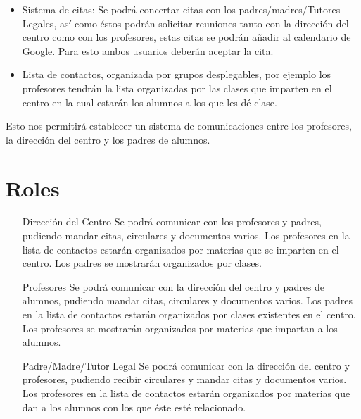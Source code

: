 \begin{itemize}
	\item Sistema de citas: Se podr\'a concertar citas con los padres/madres/Tutores Legales, as\'i como \'estos podr\'an solicitar reuniones tanto con la direcci\'on del centro como con los profesores, estas citas se podr\'an a\~nadir al calendario de Google. Para esto ambos usuarios deber\'an aceptar la cita.
	\item Lista de contactos, organizada por grupos desplegables, por ejemplo los profesores tendr\'an la lista organizadas por las clases que imparten en el centro en la cual estar\'an los alumnos a los que les d\'e clase.
\end{itemize}

Esto nos permitir\'a establecer un sistema de comunicaciones entre los profesores, la direcci\'on del centro y los padres de alumnos.

\section{Roles}

	\begin{itemize}
		\item[Direcci\'on del Centro] Se podr\'a comunicar con los profesores y padres, pudiendo mandar citas, circulares y documentos varios. Los profesores en la lista de contactos estar\'an organizados por materias que se imparten en el centro. Los padres se mostrar\'an organizados por clases.
		\item[Profesores] Se podr\'a comunicar con la direcci\'on del centro y padres de alumnos, pudiendo mandar citas, circulares y documentos varios. Los padres en la lista de contactos estar\'an organizados por clases existentes en el centro. Los profesores se mostrar\'an organizados por materias que impartan a los alumnos.
		\item[Padre/Madre/Tutor Legal] Se podr\'a comunicar con la direcci\'on del centro y profesores, pudiendo recibir circulares y mandar citas y documentos varios. Los profesores en la lista de contactos estar\'an organizados por materias que dan a los alumnos con los que \'este est\'e relacionado.
	\end{itemize}